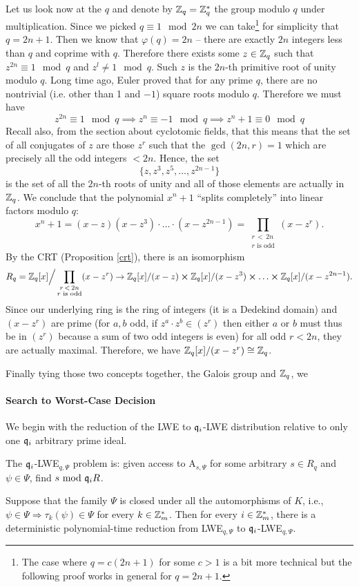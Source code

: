 Let us look now at the $q$ and denote by $\mathbb{Z}_q = \mathbb{Z}_q^*$ the group modulo $q$ under multiplication. Since we picked $q \equiv 1 \mod 2n$ we can take\footnote{The case where $q = c(2n+1)$ for some $c > 1$ is a bit more technical but the following proof works in general for $q = 2n+1$.} for simplicity that $q = 2n + 1$. Then we know that $\varphi(q) = 2n$ -- there are exactly $2n$ integers less than $q$ and coprime with $q$. Therefore there exists some $z \in \mathbb{Z}_q$ such that $z^{2n} \equiv 1 \mod q$ and $z^l \neq 1 \mod q$. Such $z$ is the $2n$-th primitive root of unity modulo $q$. Long time ago, Euler proved that for any prime $q$, there are no nontrivial (i.e. other than 1 and $-1$) square roots modulo $q$. Therefore we must have
\[ z^{2n} \equiv 1 \mod q \implies z^n \equiv -1 \mod q \implies z^n + 1 \equiv 0 \mod q\]
Recall also, from the section about cyclotomic fields, that this means that the set of all conjugates of $z$ are those $z^r$ such that the $\gcd(2n, r) = 1$ which are precisely all the odd integers $< 2n$. Hence, the set
\[ \{z, z^3, z^5, \ldots, z^{2n-1} \} \]
is the set of all the $2n$-th roots of unity and all of those elements are actually in $\mathbb{Z}_q$. We conclude that the polynomial $x^n +1$ ``splits completely'' into linear factors modulo $q$:
\[ x^n + 1 = (x-z)(x-z^3) \cdot \ldots \cdot (x-z^{2n-1}) = \prod_{\substack{r \, <\, 2n \\ r \text{ is odd}}} (x-z^r). \]
By the CRT (Proposition \ref{crt}), there is an isomorphism
\[ R_q = \mathbb{Z}_q[x] \Big/\prod_{\substack{r \, < \, 2n \\ r \text{ is odd}}}(x-z^r) \rightarrow  \mathbb{Z}_q[x]/(x-z) \cross  \mathbb{Z}_q[x]/(x-z^3) \cross \ldots \cross  \mathbb{Z}_q[x]/(x-z^{2n-1}). \]
Since our underlying ring is the ring of integers (it is a Dedekind domain) and $(x-z^r)$ are prime (for $a,b$ odd, if $z^a \cdot z^b \in (z^r)$ then either $a$ or $b$ must thus be in $(z^r)$ because a sum of two odd integers is even) for all odd $r < 2n$, they are actually maximal. Therefore, we have $\mathbb{Z}_q[x]/(x-z^r) \cong \mathbb{Z}_q$. 

Finally tying those two concepts together, the Galois group and $\mathbb{Z}_q$, we 

\paragraph{Search to Worst-Case Decision}
We begin with the reduction of the LWE to $\mathfrak{q}_i$-LWE distribution relative to only one $\mathfrak{q}_i$ arbitrary prime ideal.
\begin{definition}
	The $\mathfrak{q}_i$-LWE$_{q,\Psi}$ problem is: given access to A$_{s,\Psi}$ for some arbitrary $s \in R_q$ and $\psi \in \Psi$, find $s \text{ mod } \mathfrak{q}_i R$.
\end{definition}
\begin{lemma}
	Suppose that the family $\Psi$ is closed under all the automorphisms of $K$, i.e., $\psi \in \Psi \Rightarrow \tau_k(\psi) \in \Psi$ for every $k \in \mathbb{Z}^*_m$. Then for every $i \in \mathbb{Z}^*_m$, there is a deterministic polynomial-time reduction from LWE$_{q, \Psi}$ to $\mathfrak{q}_i$-LWE$_{q, \Psi}$.
\end{lemma}

